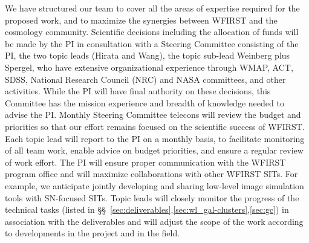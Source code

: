 %
%


 We have structured our team to
cover all the areas of expertise required for
the proposed work, and to maximize the synergies between WFIRST
and the cosmology community.
Scientific decisions including the allocation of
funds will be made by the PI in consultation with a Steering
Committee consisting of the PI, the two topic leads (Hirata and Wang),
the topic sub-lead Weinberg plus Spergel, who have extensive organizational experience
through WMAP, ACT, SDSS, National Research Council (NRC) and NASA
committees, and other activities. While the PI will have final authority on these decisions,
this Committee has the mission experience and breadth of knowledge
needed to advise the PI. Monthly Steering
Committee telecons will review the budget and priorities so that our
effort
remains focused on the scientific success of WFIRST.
Each topic lead will report to the PI on a monthly basis, to facilitate monitoring
of all team work, enable advice on budget priorities, and ensure a
regular review of work effort. The PI will ensure proper
communication with the WFIRST program office and will maximize
collaborations with other WFIRST SITs. For
example, we anticipate jointly developing and sharing low-level image
simulation tools with SN-focused SITs. Topic leads will closely
monitor the progress of the technical tasks (listed in
\S\S~\ref{sec:deliverables},\ref{sec:wl_gal-clusters},\ref{sec:gc}) in
association with the deliverables and will adjust the scope of the
work according to developments in the project and in the field.

